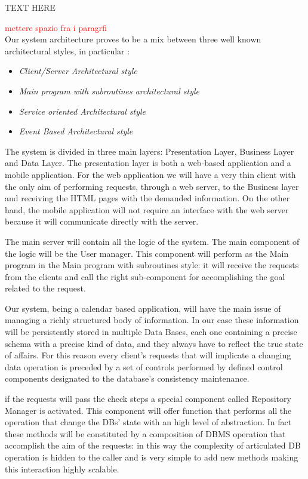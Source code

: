 
TEXT HERE


\textcolor{red}{\huge mettere spazio fra i paragrfi}\\
Our system architecture proves to be a mix between three well known architectural styles, in particular : 

\begin{itemize}
\setlength{\leftskip}{0.5cm}
\item \emph{Client/Server Architectural style}
\item \emph{Main program with subroutines architectural style}
\item \emph{Service oriented Architectural style}
\item \emph{Event Based Architectural style}
\end{itemize}

The system is divided in three main layers: Presentation Layer, Business Layer and Data Layer.
The presentation layer is both a web-based application and a mobile application. For the web application we will have a very thin client with the only aim of performing requests, through a web server, to the Business layer and receiving the HTML pages with the demanded information.
On the other hand, the mobile application will not require an interface with the web server because it will communicate directly with the server.

The main server will contain all the logic of the system. The main component of the logic will be the User manager. This component will perform as the Main program in the Main program with subroutines style: it will receive the requests from the clients and call the right sub-component for accomplishing the goal related to the request.

Our system, being a calendar based application, will have the main issue of managing a richly structured body of information. In our case these information will be persistently stored in multiple Data Bases, each one containing a precise schema with a precise kind of data, and they always have to reflect the true state of affairs. For this reason every client's requests that will implicate a changing data operation is preceded by a set of controls performed by defined control components designated to the database’s consistency maintenance.

if the requests will pass the check steps a special component called Repository Manager is activated. This component will offer function that performs all the operation that change the DBs’ state with an high level of abstraction. In fact these methods will be constituted by a composition of DBMS operation that accomplish the aim of the requests: in this way the complexity of articulated DB operation is hidden to the caller and is very simple to add new methods making this interaction highly scalable.

